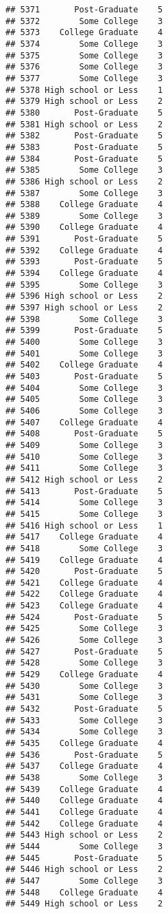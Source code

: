\documentclass[
]{article}
\begin{document}
\begin{verbatim}
## 5371       Post-Graduate    5
## 5372        Some College    3
## 5373    College Graduate    4
## 5374        Some College    3
## 5375        Some College    3
## 5376        Some College    3
## 5377        Some College    3
## 5378 High school or Less    1
## 5379 High school or Less    2
## 5380       Post-Graduate    5
## 5381 High school or Less    2
## 5382       Post-Graduate    5
## 5383       Post-Graduate    5
## 5384       Post-Graduate    5
## 5385        Some College    3
## 5386 High school or Less    2
## 5387        Some College    3
## 5388    College Graduate    4
## 5389        Some College    3
## 5390    College Graduate    4
## 5391       Post-Graduate    5
## 5392    College Graduate    4
## 5393       Post-Graduate    5
## 5394    College Graduate    4
## 5395        Some College    3
## 5396 High school or Less    2
## 5397 High school or Less    2
## 5398        Some College    3
## 5399       Post-Graduate    5
## 5400        Some College    3
## 5401        Some College    3
## 5402    College Graduate    4
## 5403       Post-Graduate    5
## 5404        Some College    3
## 5405        Some College    3
## 5406        Some College    3
## 5407    College Graduate    4
## 5408       Post-Graduate    5
## 5409        Some College    3
## 5410        Some College    3
## 5411        Some College    3
## 5412 High school or Less    2
## 5413       Post-Graduate    5
## 5414        Some College    3
## 5415        Some College    3
## 5416 High school or Less    1
## 5417    College Graduate    4
## 5418        Some College    3
## 5419    College Graduate    4
## 5420       Post-Graduate    5
## 5421    College Graduate    4
## 5422    College Graduate    4
## 5423    College Graduate    4
## 5424       Post-Graduate    5
## 5425        Some College    3
## 5426        Some College    3
## 5427       Post-Graduate    5
## 5428        Some College    3
## 5429    College Graduate    4
## 5430        Some College    3
## 5431        Some College    3
## 5432       Post-Graduate    5
## 5433        Some College    3
## 5434        Some College    3
## 5435    College Graduate    4
## 5436       Post-Graduate    5
## 5437    College Graduate    4
## 5438        Some College    3
## 5439    College Graduate    4
## 5440    College Graduate    4
## 5441    College Graduate    4
## 5442    College Graduate    4
## 5443 High school or Less    2
## 5444        Some College    3
## 5445       Post-Graduate    5
## 5446 High school or Less    2
## 5447        Some College    3
## 5448    College Graduate    4
## 5449 High school or Less    2

\end{verbatim}
\end{document}

